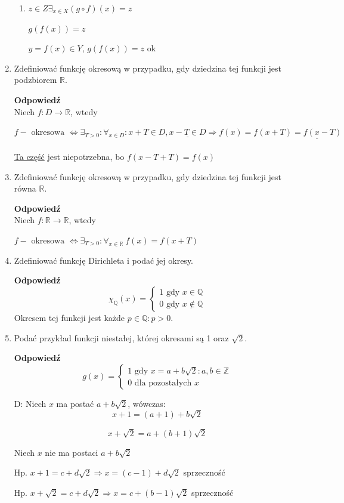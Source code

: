 \documentclass[12pt,a4paper]{article}
\theoremstyle{break}
\newcommand{\Odp}[1]{
		\begin{mdframed}[style=zadanie]
			\textbf{Odpowiedź}\\
			#1
		\end{mdframed}
	}
\newcommand{\UkladRownan}[2]{
	\left\{
	\begin{array}{l}
		#1 \\
		#2
	\end{array}
	\right.
}
\begin{document}
\begin{enumerate}[1.]
{\begin{enumerate}[(1)]
			$g(f(x_1))=g(f(x_2))$
			
			$(g\circ f)(x_1)=(g\circ f)(x_2)$ sprzeczność
			
			\item $z\in Z \exists_{x\in X} (g\circ f)(x)=z$
			
			$g(f(x))=z$
			
			$y=f(x)\in Y$, $g(f(x))=z$ ok 
		\end{enumerate}
	}
	
	\item Zdeﬁniować funkcję okresową w przypadku, gdy dziedzina tej funkcji jest podzbiorem	$\mathbb{R}$.
	\Odp{
		Niech $f:D\rightarrow \mathbb{R}$, wtedy
		
		$f-\text{ okresowa } \Leftrightarrow \exists_{T>0}: \forall_{x\in D} : x+T\in D, \underline{x-T\in D} \Rightarrow  f(x)=f(x+T)\underline{=f(x-T)}$\\\\
		
		\underline{Ta część} jest niepotrzebna, bo $f(x-T+T)=f(x)$
	}
	
	\item Zdeﬁniować funkcję okresową w przypadku, gdy dziedzina tej funkcji jest równa $\mathbb{R}$.
	\Odp{
		Niech $f:\mathbb{R}\rightarrow \mathbb{R}$, wtedy
		
		$f-\text{ okresowa } \Leftrightarrow \exists_{T>0}: \forall_{x\in \mathbb{R}}\: f(x)=f(x+T)$
		
	}
	
	\item Zdeﬁniować funkcję Dirichleta i podać jej okresy.
	\Odp{
		$$\chi_{\mathbb{Q}}(x)=\UkladRownan{1 \text{ gdy } x\in\mathbb{Q}}{0 \text{ gdy } x\notin\mathbb{Q}}$$
		Okresem tej funkcji jest każde $p\in\mathbb{Q}: p>0$.
	}
	\newpage
	\item Podać przykład funkcji niestałej, której okresami są 1 oraz $\sqrt{2}$.
	\Odp{
		$$g(x)=\UkladRownan{1 \text{ gdy } x=a+b\sqrt{2}: a,b\in \mathbb{Z}}{0 \text{ dla pozostałych } x}$$
		
		D: Niech $x$ ma postać $a+b\sqrt{2}$, wówczas:
		$$x+1=(a+1)+b\sqrt{2}$$
		
		$$x+\sqrt{2}=a+(b+1)\sqrt{2}$$
		
		Niech $x$ nie ma postaci $a+b\sqrt{2}$
		
		Hp. $x+1=c+d\sqrt{2} \Rightarrow x=(c-1)+d\sqrt{2}$ sprzeczność
		
		Hp. $x+\sqrt{2}=c+d\sqrt{2} \Rightarrow x= c+(b-1)\sqrt{2}$ sprzeczność
	}
	

\end{enumerate}
\end{document}
